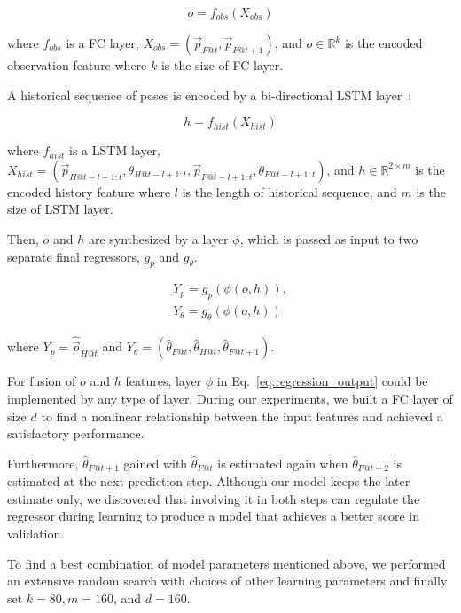 \documentclass[letterpaper, 10 pt, conference]{ieeeconf}  %
\begin{document}
	\begin{equation}
	o = f_{obs}(X_{obs})
	\end{equation}

	where $f_{obs}$ is a FC layer,
		$X_{obs} = (\vec{p}_{F@t}, \vec{p}_{F@t+1})$,
		and $o \in \mathbb{R}^{k}$ is the encoded observation feature
		where $k$ is the size of FC layer.

	A historical sequence of poses is encoded by a bi-directional LSTM layer~\cite{Wu16}:

	\begin{equation}
	h = f_{hist}(X_{hist})
	\end{equation}


     where $f_{hist}$ is a LSTM layer,
		$X_{hist} = (\vec{p}_{H@t-l+1:t}, \theta_{H@t-l+1:t},
		             \vec{p}_{F@t-l+1:t}, \theta_{F@t-l+1:t})$,
		and $h \in \mathbb{R}^{2 \times m}$ is the encoded history feature
	where $l$ is the length of historical sequence,
	and $m$ is the size of LSTM layer.

	Then, $o$ and $h$ are synthesized by a layer $\phi$, which is
	passed as input to two separate final regressors, $g_{p}$ and $g_\theta$.

	\begin{equation}
	\begin{split}
	Y_{p} = g_{p}(\phi(o, h)),\\
	Y_{\theta}= g_{\theta}(\phi(o, h))
	\end{split}
	\label{eq:regression_output}
	\end{equation}

	where
	$Y_{p} = \hat{\vec{p}}_{H@t}$ and
	$Y_{\theta} = (\hat{\theta}_{F@t}, \hat{\theta}_{H@t}, \hat{\theta}_{F@t+1})$.

    For fusion of $o$ and $h$ features, layer $\phi$ in Eq.~\eqref{eq:regression_output}
	could be implemented by any type of layer. During our experiments, we
	built a FC layer of size $d$ to find a nonlinear relationship between the input
	features and achieved a satisfactory performance.

	Furthermore, $\hat{\theta}_{F@t+1}$ gained with $\hat{\theta}_{F@t}$ is
	estimated again when $\hat{\theta}_{F@t+2}$ is estimated at the next
	prediction step. Although our model keeps the later estimate only,
	we discovered that involving it in both steps can regulate the regressor
	during learning to produce a model that achieves a better score in validation.

	To find a best combination of model parameters mentioned above, we performed
	an extensive random search with choices of other learning parameters and
	finally set $k=80, m=160$, and $d=160$.
\end{document}
